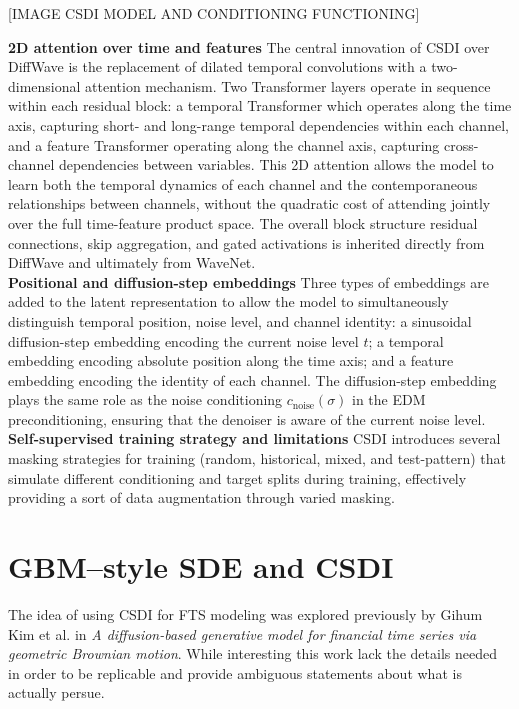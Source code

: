 [IMAGE CSDI MODEL AND CONDITIONING FUNCTIONING]

\textbf{2D attention over time and features}
The central innovation of CSDI over DiffWave is the replacement of dilated 
temporal convolutions with a two-dimensional attention mechanism. Two Transformer 
layers \cite{vaswani2017attention} operate in sequence within each residual block: a temporal Transformer which operates along the time axis, capturing short- and long-range temporal dependencies within each channel, and a feature Transformer operating along the channel axis, capturing cross-channel dependencies between variables. This 2D attention allows the model to learn both the temporal dynamics of each channel and the 
contemporaneous relationships between channels, without the quadratic cost of 
attending jointly over the full time-feature product space. The overall block 
structure residual connections, skip aggregation, and gated activations 
is inherited directly from DiffWave and ultimately from WaveNet.\\

\textbf{Positional and diffusion-step embeddings} Three types of embeddings are added to the latent representation to allow the model to simultaneously distinguish temporal position, noise level, and channel 
identity: a sinusoidal diffusion-step embedding encoding the current noise level 
$t$; a temporal embedding encoding absolute position along the time axis; and a 
feature embedding encoding the identity of each channel. The diffusion-step 
embedding plays the same role as the noise conditioning $c_{\text{noise}}(\sigma)$ 
in the EDM preconditioning, ensuring that the denoiser is aware of the current noise level.\\

\textbf{Self-supervised training strategy and limitations}
CSDI introduces several masking strategies for training (random, historical, 
mixed, and test-pattern) that simulate different conditioning and target splits 
during training, effectively providing a sort of data augmentation through varied 
masking.

\section{GBM--style SDE and CSDI}
The idea of using CSDI for FTS modeling was explored previously by Gihum Kim et al. in \emph{A diffusion-based generative model for financial time series via geometric Brownian motion}. While interesting this work lack the details needed in order to be replicable and provide ambiguous statements about what is actually persue.\\

